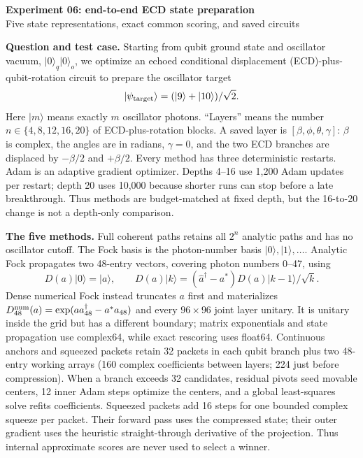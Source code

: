 \documentclass[10pt]{article}
\newcommand{\ket}[1]{\lvert #1\rangle}
\begin{document}
\begin{center}
{\Large\bfseries Experiment 06: end-to-end ECD state preparation}\\[-1pt]
{\small Five state representations, exact common scoring, and saved circuits}
\end{center}

\textbf{Question and test case.}
Starting from qubit ground state and oscillator vacuum,
$\ket{0}_q\ket{0}_o$, we optimize an echoed conditional displacement
(ECD)-plus-qubit-rotation circuit to prepare
the oscillator target
\[
 \ket{\psi_{\rm target}}=(\ket9+\ket{10})/\sqrt2 .
\]
Here $\ket m$ means exactly $m$ oscillator photons.  ``Layers'' means the
number $n\in\{4,8,12,16,20\}$ of ECD-plus-rotation blocks.  A saved layer is
$[\beta,\phi,\theta,\gamma]$: $\beta$ is complex, the angles are in radians,
$\gamma=0$, and the two ECD branches are displaced by $-\beta/2$ and
$+\beta/2$.  Every method has three deterministic restarts. Adam is an adaptive
gradient optimizer. Depths 4--16 use 1,200 Adam updates per restart; depth 20
uses 10,000 because shorter runs can
stop before a late breakthrough. Thus methods are budget-matched at fixed
depth, but the 16-to-20 change is not a depth-only comparison.

\textbf{The five methods.}
Full coherent paths retains all $2^n$ analytic paths and has no oscillator
cutoff. The Fock basis is the photon-number basis $\ket0,\ket1,\ldots$.
Analytic Fock propagates two 48-entry vectors, covering photon numbers 0--47,
using
\[
 D(a)\ket0=\ket a,\qquad
 D(a)\ket k=(\hat a^\dagger-a^*)D(a)\ket{k-1}/\sqrt{k}.
\]
Dense numerical Fock instead truncates $a$ first and materializes
$D_{48}^{\rm num}(a)=\exp(a a_{48}^\dagger-a^*a_{48})$ and every $96\times96$
joint layer unitary. It is unitary inside the grid but has a different boundary;
matrix exponentials and state propagation use complex64, while exact rescoring
uses float64.
Continuous anchors and squeezed packets retain 32 packets in each qubit branch
plus two 48-entry working arrays (160 complex coefficients between layers;
224 just before compression). When a branch exceeds 32 candidates, residual pivots seed movable
centers, 12 inner Adam steps optimize the centers, and a global least-squares
solve refits coefficients.  Squeezed packets add 16 steps for one bounded
complex squeeze per packet.  Their forward pass uses the compressed state;
their outer gradient uses the heuristic straight-through derivative of the
projection.  Thus internal approximate scores are never used to select a
winner.
\end{document}
